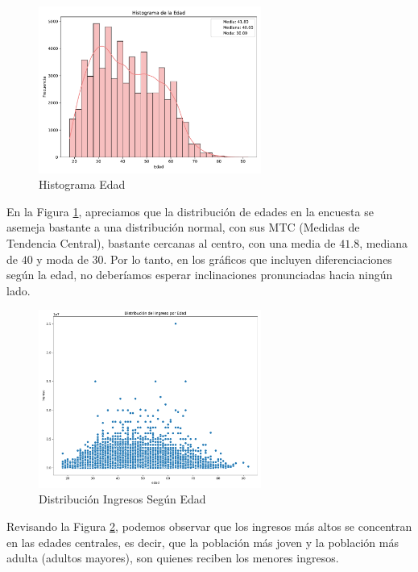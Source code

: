 \documentclass{article}
\begin{document}
	\begin{figure}[htbp]
		\centering
		\includegraphics[width=0.65\textwidth]{../output/fig/HistoEdad.pdf}
		\caption{\label{02fig} Histograma Edad}
	\end{figure}
	
	\FloatBarrier
	
	En la Figura \ref{02fig}, apreciamos que la distribución de edades en la encuesta se asemeja bastante a una distribución normal, con sus MTC (Medidas de Tendencia Central), bastante cercanas al centro, con una media de $41.8$, mediana de $40$ y moda de $30$. Por lo tanto, en los gráficos que incluyen diferenciaciones según la edad, no deberíamos esperar inclinaciones pronunciadas hacia ningún lado.
	
	\FloatBarrier
	
	
	\begin{figure}[htbp]
		\centering
		\includegraphics[width=0.65\textwidth]{../output/fig/DistIngEdad.pdf}
		\caption{\label{03fig} Distribución Ingresos Según Edad}
	\end{figure}
	
	\FloatBarrier
	
	Revisando la Figura \ref{03fig}, podemos observar que los ingresos más altos se concentran en las edades centrales, es decir, que la población más joven y la población más adulta (adultos mayores), son quienes reciben los menores ingresos.
	
\end{document}
